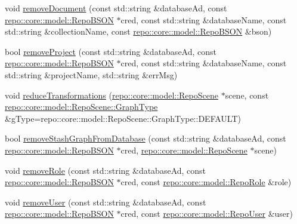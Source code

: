\begin{DoxyCompactItemize}
void \hyperlink{classrepo_1_1manipulator_1_1_repo_manipulator_a81065d2986d422e8f67692041d343905}{remove\+Document} (const std\+::string \&database\+Ad, const \hyperlink{classrepo_1_1core_1_1model_1_1_repo_b_s_o_n}{repo\+::core\+::model\+::\+Repo\+B\+S\+O\+N} $\ast$cred, const std\+::string \&database\+Name, const std\+::string \&collection\+Name, const \hyperlink{classrepo_1_1core_1_1model_1_1_repo_b_s_o_n}{repo\+::core\+::model\+::\+Repo\+B\+S\+O\+N} \&bson)
\item 
bool \hyperlink{classrepo_1_1manipulator_1_1_repo_manipulator_a07ce72512829cc15c2550c505925fc25}{remove\+Project} (const std\+::string \&database\+Ad, const \hyperlink{classrepo_1_1core_1_1model_1_1_repo_b_s_o_n}{repo\+::core\+::model\+::\+Repo\+B\+S\+O\+N} $\ast$cred, const std\+::string \&database\+Name, const std\+::string \&project\+Name, std\+::string \&err\+Msg)
\item 
void \hyperlink{classrepo_1_1manipulator_1_1_repo_manipulator_a98b4b3a2bbf96b4c6c2a2f024cda4e43}{reduce\+Transformations} (\hyperlink{classrepo_1_1core_1_1model_1_1_repo_scene}{repo\+::core\+::model\+::\+Repo\+Scene} $\ast$scene, const \hyperlink{classrepo_1_1core_1_1model_1_1_repo_scene_aefcacd6eb4c7774ac1bfe3a6b223337c}{repo\+::core\+::model\+::\+Repo\+Scene\+::\+Graph\+Type} \&g\+Type=repo\+::core\+::model\+::\+Repo\+Scene\+::\+Graph\+Type\+::\+D\+E\+F\+A\+U\+L\+T)
\item 
bool \hyperlink{classrepo_1_1manipulator_1_1_repo_manipulator_aead90d3abe4bbbb4b13df661b4968067}{remove\+Stash\+Graph\+From\+Database} (const std\+::string \&database\+Ad, const \hyperlink{classrepo_1_1core_1_1model_1_1_repo_b_s_o_n}{repo\+::core\+::model\+::\+Repo\+B\+S\+O\+N} $\ast$cred, \hyperlink{classrepo_1_1core_1_1model_1_1_repo_scene}{repo\+::core\+::model\+::\+Repo\+Scene} $\ast$scene)
\item 
void \hyperlink{classrepo_1_1manipulator_1_1_repo_manipulator_a06242a6564f5f18ce3c3a21bc6faf6c5}{remove\+Role} (const std\+::string \&database\+Ad, const \hyperlink{classrepo_1_1core_1_1model_1_1_repo_b_s_o_n}{repo\+::core\+::model\+::\+Repo\+B\+S\+O\+N} $\ast$cred, const \hyperlink{classrepo_1_1core_1_1model_1_1_repo_role}{repo\+::core\+::model\+::\+Repo\+Role} \&role)
\item 
void \hyperlink{classrepo_1_1manipulator_1_1_repo_manipulator_a9398ab884c08d8068495376e1a8f43ca}{remove\+User} (const std\+::string \&database\+Ad, const \hyperlink{classrepo_1_1core_1_1model_1_1_repo_b_s_o_n}{repo\+::core\+::model\+::\+Repo\+B\+S\+O\+N} $\ast$cred, const \hyperlink{classrepo_1_1core_1_1model_1_1_repo_user}{repo\+::core\+::model\+::\+Repo\+User} \&user)

\end{DoxyCompactItemize}
